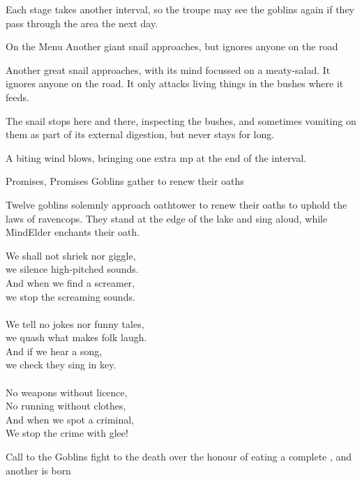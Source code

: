 Each stage takes another \gls{interval}, so the troupe may see the goblins again if they pass through the area the next day.

{On the Menu}%
{Another giant snail approaches, but ignores anyone on the road}%

Another great snail approaches, with its mind focussed on a meaty-salad.
It ignores anyone on the road.
It only attacks living things in the bushes where it feeds.

The snail stops here and there, inspecting the bushes, and sometimes vomiting on them as part of its external digestion, but never stays for long.

A biting wind blows, bringing one extra \gls{mp} at the end of the \gls{interval}.

{Promises, Promises}%
{Goblins gather to renew their oaths}%

Twelve goblins solemnly approach \gls{oathtower} to renew their oaths to uphold the laws of \gls{ravencops}.
They stand at the edge of the lake and sing aloud, while \gls{MindElder} enchants their oath.

\label{ravencopsLaws}
\begin{speechtext}
  We shall not shriek nor giggle, \\
  we silence high-pitched sounds. \\
  And when we find a screamer, \\
  we stop the screaming sounds. \\
  \\
  We tell no jokes nor funny tales, \\
  we quash what makes folk laugh. \\
  And if we hear a song, \\
  we check they sing in key. \\
  \\
  No weapons without licence, \\
  No running without clothes, \\
  And when we spot a criminal, \\
  We stop the crime with glee!
\end{speechtext}

{Call to the }%
{Goblins fight to the death over the honour of eating a complete , and another  is born}%


